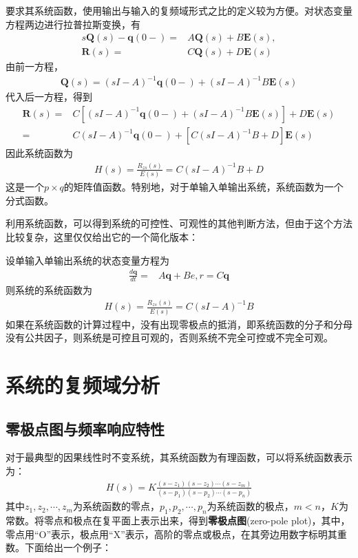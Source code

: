 \documentclass{ctexbook}
\begin{document}
要求其系统函数，使用输出与输入的复频域形式之比的定义较为方便。对状态变量方程两边进行拉普拉斯变换，有
\begin{align*}
    s\mathbf{Q}(s)-\mathbf{q}(0-)=&A\mathbf{Q}(s)+B\mathbf{E}(s),\\
    \mathbf{R}(s)=&C\mathbf{Q}(s)+D\mathbf{E}(s)
\end{align*}
由前一方程，
\begin{align*}
    \mathbf{Q}(s)=(sI-A)^{-1}\mathbf{q}(0-)+(sI-A)^{-1}B\mathbf{E}(s)
\end{align*}
代入后一方程，得到
\begin{align*}
    \mathbf{R}(s)=&C\left[(sI-A)^{-1}\mathbf{q}(0-)+(sI-A)^{-1}B\mathbf{E}(s)\right]+D\mathbf{E}(s)\\
    =&C(sI-A)^{-1}\mathbf{q}(0-)+\left[C(sI-A)^{-1}B+D\right]\mathbf{E}(s)
\end{align*}
因此系统函数为
\begin{align*}
    H(s)=\frac{R_{zs}(s)}{E(s)}=C(sI-A)^{-1}B+D
\end{align*}
这是一个$p\times q$的矩阵值函数。特别地，对于单输入单输出系统，系统函数为一个分式函数。

利用系统函数，可以得到系统的可控性、可观性的其他判断方法，但由于这个方法比较复杂，这里仅仅给出它的一个简化版本：
\begin{claim}
    设单输入单输出系统的状态变量方程为
    \begin{align*}
        \frac{d\mathbf{q}}{dt}=&A\mathbf{q}+B e,r=C\mathbf{q}
    \end{align*}
    则系统的系统函数为
    \begin{align*}
        H(s)=\frac{R_{zs}(s)}{E(s)}=C(sI-A)^{-1}B
    \end{align*}
    如果在系统函数的计算过程中，没有出现零极点的抵消，即系统函数的分子和分母没有公共因子，则系统是可控且可观的，否则系统不完全可控或不完全可观。
\end{claim}

\section{系统的复频域分析}\label{sec:Complex_Freq_Analysis}

\subsection{零极点图与频率响应特性}\label{sub:zero_pole_characteristics}

对于最典型的因果线性时不变系统，其系统函数为有理函数，可以将系统函数表示为：
\begin{align*}
    H(s)=K\frac{(s-z_1)(s-z_2)\cdots (s-z_m)}{(s-p_1)(s-p_2)\cdots (s-p_n)}
\end{align*}
其中$z_1,z_2,\cdots ,z_m$为系统函数的零点，$p_1,p_2,\cdots ,p_n$为系统函数的极点，$m<n$，$K$为常数。将零点和极点在复平面上表示出来，得到\textbf{零极点图}(zero-pole plot)，其中，零点用“O”表示，极点用“X”表示，高阶的零点或极点，在其旁边用数字标明其重数。下面给出一个例子：
\end{document}
